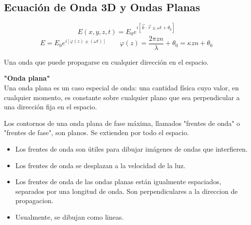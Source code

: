 \documentclass[12pt]{article}
\begin{document}
	\subsection{Ecuación de Onda 3D y Ondas Planas}
	\begin{equation*}
		E(x,y,z,t) = E_0 e^{i[\vec{k}\cdot\vec{r} \pm \omega t + \theta_0]}
	\end{equation*}
	\begin{equation*}
		E = E_0 e^{i[\varphi(z) \pm (\omega t)]} \qquad \varphi(z) = \frac{2\pi z n}{\lambda} + \theta_0 = \kappa z n + \theta_0
	\end{equation*}
	
	Una onda que puede propagarse en cualquier dirección en el espacio.
	
	\begin{center}
	\end{center}
	
	\vspace{0.5cm}
	\textbf{"Onda plana"}\\
	Una onda plana es un caso especial de onda: una cantidad física cuyo valor, en cualquier momento, es constante sobre cualquier plano que sea perpendicular a una dirección fija en el espacio.
	
	Los contornos de una onda plana de fase máxima, llamados "frentes de onda" o "frentes de fase", son planos. Se extienden por todo el espacio.
	
	\begin{itemize}
		\item Los frentes de onda son útiles para dibujar imágenes de ondas que interfieren.
		\item Los frentes de onda se desplazan a la velocidad de la luz.
		\item Los frentes de onda de las ondas planas están igualmente espaciados, separados por una longitud de onda. Son perpendiculares a la direccion de propagacion.
		\item Usualmente, se dibujan como lineas.
	\end{itemize}
	
\end{document}
